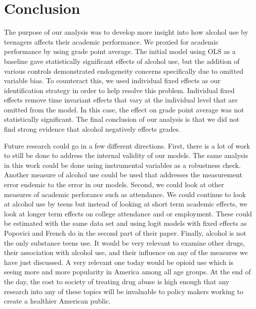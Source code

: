\documentclass[11pt]{article}
\begin{document}
\section*{Conclusion}

The purpose of our analysis was to develop more insight into how alcohol use by teenagers affects their academic performance. We proxied for academic performance by using grade point average. The initial model using OLS as a baseline gave statistically significant effects of alcohol use, but the addition of various controls demonstrated endogeneity concerns specifically due to omitted variable bias. To counteract this, we used individual fixed effects as our identification strategy in order to help resolve this problem. Individual fixed effects remove time invariant effects that vary at the individual level that are omitted from the model. In this case, the effect on grade point average was not statistically significant. The final conclusion of our analysis is that we did not find strong evidence that alcohol negatively effects grades. 

Future research could go in a few different directions. First, there is a lot of work to still be done to address the internal validity of our models. The same analysis in this work could be done using instrumental variables as a robustness check. Another measure of alcohol use could be used that addresses the measurement error endemic to the error in our models. Second, we could look at other measures of academic perforance such as attendance. We could continue to look at alcohol use by teens but instead of looking at short term academic effects, we look at longer term effects on college attendance and or employment. These could be estimated with the same data set and using logit models with fixed effects as Popovici and French do in the second part of their paper. Finally, alcohol is not the only substance teens use. It would be very relevant to examine other drugs, their association with alcohol use, and their influence on any of the measures we have just discussed. A very relevant one today would be opioid use which is seeing more and more popularity in America among all age groups. At the end of the day, the cost to society of treating drug abuse is high enough that any research into any of these topics will be invaluable to policy makers working to create a healthier American public. 


\newpage



\end{document}
